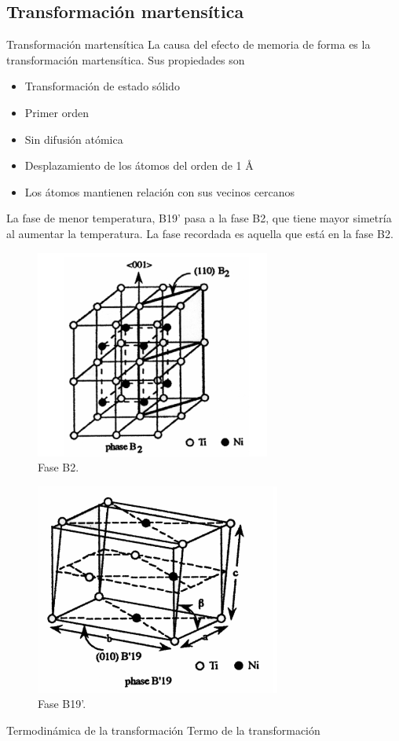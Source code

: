 \documentclass[11pt]{beamer}
\begin{document}
	\subsection{Transformación martensítica}
		\begin{frame}{Transformación martensítica}
			La causa del efecto de memoria de forma es la transformación martensítica.
			Sus propiedades son
			\begin{itemize}
				\item Transformación de estado sólido
				\item Primer orden
				\item Sin difusión atómica
				\item Desplazamiento de los átomos del orden de 1 \AA
				\item Los átomos mantienen relación con sus vecinos cercanos
			\end{itemize}
		\end{frame}
		
		\begin{frame}
			La fase de menor temperatura, B19' pasa a la fase B2, que tiene mayor simetría al aumentar la temperatura. La fase recordada es aquella que está en la fase B2.
			\begin{figure}[H]
				\centering
				\includegraphics[scale=0.1]{img/B2Phase.png}
				\caption{Fase B2.}
				\label{magnetrones}
			\end{figure}
			\begin{figure}[H]
				\centering
				\includegraphics[scale=0.1]{img/B19pPhase.png}
				\caption{Fase B19'.}
				\label{magnetrones}
			\end{figure}
		\end{frame}
		\begin{frame}{Termodinámica de la transformación}
			Termo de la transformación
		\end{frame}
\end{document}
